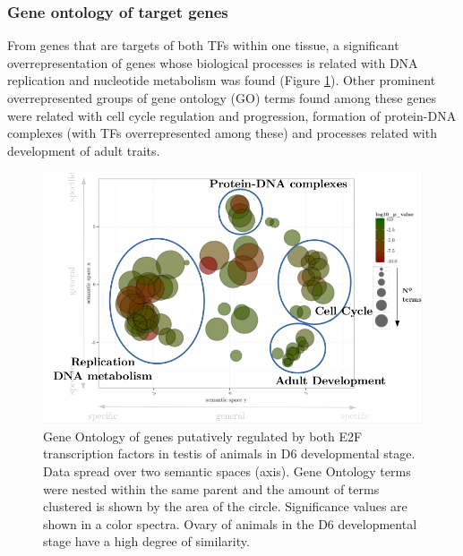 \documentclass[11pt,twoside,a4paper]{report}
\begin{document}
		\subsubsection{Gene ontology of target genes}
		From genes that are targets of both TFs within one tissue, a significant overrepresentation of genes whose biological processes is related with DNA replication and nucleotide metabolism was found (Figure \ref{fig:GO}). Other prominent overrepresented groups of gene ontology (GO) terms found among these genes were related with cell cycle regulation and progression, formation of protein-DNA complexes (with TFs overrepresented among these) and processes related with development of adult traits.
		
		\begin{figure}[here]
			\centering
			\includegraphics[width=1\textwidth]{pngs/E2F_overlap_overlaps_GO.png}
			\caption[Gene Ontology of genes putatively regulated by both E2F transcription factors]
			{Gene Ontology of genes putatively regulated by both E2F transcription factors in testis of animals in D6 developmental stage.
				{\footnotesize 
					Data spread over two semantic spaces (axis).
					Gene Ontology terms were nested within the same parent and the amount of terms clustered is shown by the area of the circle.
					Significance values are shown in a color spectra.
					Ovary of animals in the D6 developmental stage have a high degree of similarity.
				}
			}
			\label{fig:GO}
		\end{figure}
		
\end{document}
